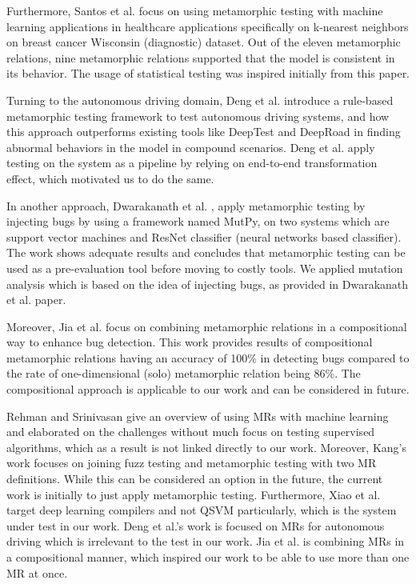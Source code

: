 \documentclass[12pt,a4paper]{article}
\begin{document}
	Furthermore, Santos et al. \cite{ssantos2020} focus on using metamorphic testing with machine learning applications in healthcare applications specifically on k-nearest neighbors on breast cancer Wisconsin (diagnostic) dataset. Out of the eleven metamorphic relations, nine metamorphic relations supported that the model is consistent in its behavior. The usage of statistical testing was inspired initially from this paper.
	
	Turning to the autonomous driving domain, Deng et al. \cite{ydeng2023} introduce a rule-based metamorphic testing framework to test autonomous driving systems, and how this approach outperforms existing tools like DeepTest and DeepRoad in finding abnormal behaviors in the model in compound scenarios. Deng et al. \cite{ydeng2023} apply testing on the system as a pipeline by relying on end-to-end transformation effect, which motivated us to do the same.
	
	In another approach, Dwarakanath et al. \cite{Dwarakanath2018}, apply metamorphic testing by injecting bugs by using a framework named MutPy, on two systems which are support vector machines and ResNet classifier (neural networks based classifier). The work shows adequate results and concludes that metamorphic testing can be used as a pre-evaluation tool before moving to costly tools. We applied mutation analysis which is based on the idea of injecting bugs, as provided in Dwarakanath et al. \cite{Dwarakanath2018} paper.
	
	Moreover, Jia et al. \cite{mjia2020} focus on combining metamorphic relations in a compositional way to enhance bug detection. This work provides results of compositional metamorphic relations having an accuracy of 100\% in detecting bugs compared to the rate of one-dimensional (solo) metamorphic relation being 86\%. The compositional approach is applicable to our work and can be considered in future.
	
	Rehman and Srinivasan \cite{frehman2023} give an overview of using MRs with machine learning and elaborated on the challenges without much focus on testing supervised algorithms, which as a result is not linked directly to our work. Moreover, Kang's work \cite{dkang2022} focuses on joining fuzz testing and metamorphic testing with two MR definitions. While this can be considered an option in the future, the current work is initially to just apply metamorphic testing. Furthermore, Xiao et al. \cite{dciao2022} target deep learning compilers and not QSVM particularly, which is the system under test in our work. Deng et al.'s \cite{ydeng2023} work is focused on MRs for autonomous driving which is irrelevant to the test in our work. Jia et al. \cite{mjia2020} is combining MRs in a compositional manner, which inspired our work to be able to use more than one MR at once.
	
\end{document}

